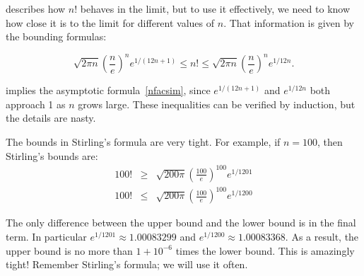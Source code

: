  describes how $n!$ behaves in the limit, but to
use it effectively, we need to know how close it is to the limit for
different values of $n$.  That information is given by the bounding
formulas:
\begin{fact*}
\[
\sqrt{2 \pi n} \left(\frac{n}{e}\right)^n e^{1/(12n+1)} \leq n! \leq
\sqrt{2 \pi n} \left(\frac{n}{e}\right)^n e^{1/12n}.
\]
\end{fact*}
 implies the asymptotic
formula~\eqref{nfacsim}, since $e^{1/(12n+1)}$ and $e^{1/12n}$ both
approach 1 as $n$ grows large.  These inequalities can be verified by
induction, but the details are nasty.

The bounds in Stirling's formula are very tight.  For example, if $n =
100$, then Stirling's bounds are:
\begin{eqnarray*}
100! & \geq & \sqrt{200 \pi} \left(\frac{100}{e}\right)^{100} e^{1/1201} \\
100! & \leq & \sqrt{200 \pi} \left(\frac{100}{e}\right)^{100} e^{1/1200}
\end{eqnarray*}

The only difference between the upper bound and the lower bound is in
the final term.  In particular $e^{1/1201} \approx 1.00083299$ and
$e^{1/1200} \approx 1.00083368$.  As a result, the upper bound is no
more than $1 + 10^{-6}$ times the lower bound.  This is amazingly
tight!  Remember Stirling's formula; we will use it often.

\begin{problems}
\classproblems
{}
\end{problems}


